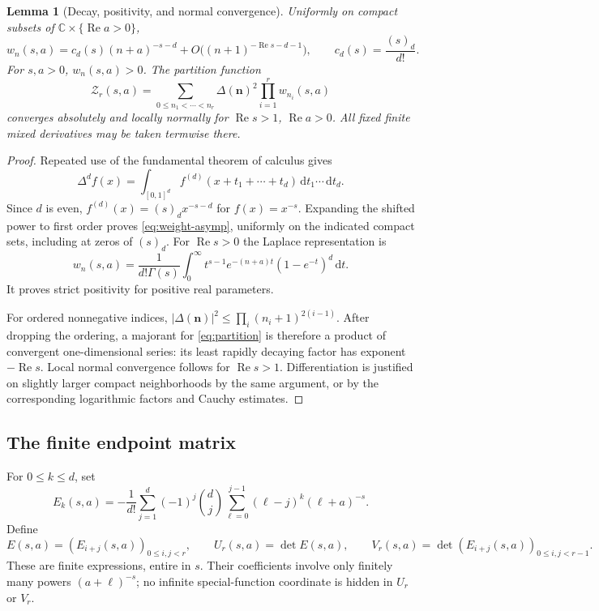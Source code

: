 \documentclass[11pt,letterpaper]{article}
\numberwithin{equation}{section}
\newtheorem{lemma}[theorem]{Lemma}
\theoremstyle{definition}\newtheorem{definition}[theorem]{Definition}
\theoremstyle{remark}\newtheorem{remark}[theorem]{Remark}
\DeclareMathOperator{\Rea}{Re}
\newcommand{\C}{\mathbb C}\newcommand{\Q}{\mathbb Q}\newcommand{\N}{\mathbb N}
\newcommand{\Z}{\mathcal Z}\newcommand{\Bell}{\mathcal B}
\newcommand{\dd}{\,\mathrm d}
\begin{document}
\begin{lemma}[Decay, positivity, and normal convergence]\label{lem:decay}
Uniformly on compact subsets of $\C\times\{\Rea a>0\}$,
\begin{equation}\label{eq:weight-asymp}
 w_n(s,a)=c_d(s)(n+a)^{-s-d}
          +O\bigl((n+1)^{-\Rea s-d-1}\bigr),
 \qquad c_d(s)=\frac{(s)_d}{d!}.
\end{equation}
For $s,a>0$, $w_n(s,a)>0$. The partition function
\begin{equation}\label{eq:partition}
 \Z_r(s,a)=\sum_{0\le n_1<\cdots<n_r}
       \Delta(\bm n)^2\prod_{i=1}^r w_{n_i}(s,a)
\end{equation}
converges absolutely and locally normally for $\Rea s>1$, $\Rea a>0$.
All fixed finite mixed derivatives may be taken termwise there.
\end{lemma}
\begin{proof}
Repeated use of the fundamental theorem of calculus gives
\[
 \Delta^d f(x)=\int_{[0,1]^d}f^{(d)}(x+t_1+\cdots+t_d)
       \dd t_1\cdots\dd t_d.
\]
Since $d$ is even, $f^{(d)}(x)=(s)_d x^{-s-d}$ for $f(x)=x^{-s}$.
Expanding the shifted power to first order proves
\eqref{eq:weight-asymp}, uniformly on the indicated compact sets, including
at zeros of $(s)_d$.
For $\Rea s>0$ the Laplace representation is
\begin{equation}\label{eq:laplace}
 w_n(s,a)=\frac1{d!\Gamma(s)}
 \int_0^\infty t^{s-1}e^{-(n+a)t}(1-e^{-t})^d\dd t.
\end{equation}
It proves strict positivity for positive real parameters.

For ordered nonnegative indices,
$|\Delta(\bm n)|^2\le\prod_i(n_i+1)^{2(i-1)}$.
After dropping the ordering, a majorant for \eqref{eq:partition} is
therefore a product of convergent one-dimensional series: its least
rapidly decaying factor has exponent $-\Rea s$.
Local normal convergence follows for $\Rea s>1$. Differentiation is
justified on slightly larger compact neighborhoods by the same argument,
or by the corresponding logarithmic factors and Cauchy estimates.
\end{proof}

\subsection{The finite endpoint matrix}
For $0\le k\le d$, set
\begin{equation}\label{eq:E}
 E_k(s,a)=-\frac1{d!}\sum_{j=1}^{d}(-1)^j\binom dj
       \sum_{\ell=0}^{j-1}(\ell-j)^k(\ell+a)^{-s}.
\end{equation}
Define
\begin{equation}\label{eq:UV}
 E(s,a)=(E_{i+j}(s,a))_{0\le i,j<r},\qquad
 U_r(s,a)=\det E(s,a),\qquad
 V_r(s,a)=\det(E_{i+j}(s,a))_{0\le i,j<r-1}.
\end{equation}
These are finite expressions, entire in $s$. Their coefficients involve
only finitely many powers $(a+\ell)^{-s}$; no infinite special-function
coordinate is hidden in $U_r$ or $V_r$.
\end{document}
